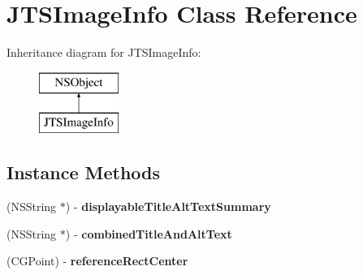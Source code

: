 \hypertarget{interface_j_t_s_image_info}{}\section{J\+T\+S\+Image\+Info Class Reference}
\label{interface_j_t_s_image_info}
Inheritance diagram for J\+T\+S\+Image\+Info\+:\begin{figure}[H]
\begin{center}
\leavevmode
\includegraphics[height=2.000000cm]{interface_j_t_s_image_info}
\end{center}
\end{figure}
\subsection*{Instance Methods}
\begin{DoxyCompactItemize}
\item 
\hypertarget{interface_j_t_s_image_info_a5163911db372642aa03a25ef3afe94a1}{}(N\+S\+String $\ast$) -\/ {\bfseries displayable\+Title\+Alt\+Text\+Summary}\label{interface_j_t_s_image_info_a5163911db372642aa03a25ef3afe94a1}

\item 
\hypertarget{interface_j_t_s_image_info_afef230f3cd1f7376fc865f5df9b0670e}{}(N\+S\+String $\ast$) -\/ {\bfseries combined\+Title\+And\+Alt\+Text}\label{interface_j_t_s_image_info_afef230f3cd1f7376fc865f5df9b0670e}

\item 
\hypertarget{interface_j_t_s_image_info_a4906864f1af9111dc7c0b6d4240e8cdc}{}(C\+G\+Point) -\/ {\bfseries reference\+Rect\+Center}\label{interface_j_t_s_image_info_a4906864f1af9111dc7c0b6d4240e8cdc}

\end{DoxyCompactItemize}
